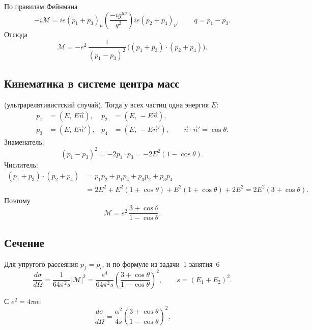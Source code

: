 \documentclass[../final.tex]{subfiles}
\begin{document}
По правилам Фейнмана
\begin{equation*}
    -i\mathcal M=ie(p_1+p_3)_\mu
    \left(\frac{-ig^{\mu\nu}}{q^2}\right)
    ie(p_2+p_4)_\nu,
    \qquad
    q=p_1-p_3.
\end{equation*}
Отсюда
\begin{equation*}
    \mathcal M=-e^2\,\frac{1}{(p_1-p_3)^2}\,
    \bigl((p_1+p_3)\cdot(p_2+p_4)\bigr).
\end{equation*}

\subsection*{Кинематика в системе центра масс}

(ультрарелятивистский случай). Тогда у всех частиц одна энергия $E$:
\begin{align*}
    p_1&=(E,\,E\vec n), & p_2&=(E,\,-E\vec n),\\
    p_3&=(E,\,E\vec n'), & p_4&=(E,\,-E\vec n'),
    \qquad \vec n\cdot\vec n'=\cos\theta.
\end{align*}
Знаменатель:
\begin{equation*}
    (p_1-p_3)^2=-2p_1\cdot p_3=-2E^2(1-\cos\theta).
\end{equation*}
Числитель:
\begin{align*}
    (p_1+p_3)\cdot(p_2+p_4)
    &=p_1p_2+p_1p_4+p_3p_2+p_3p_4\\
    &=2E^2+E^2(1+\cos\theta)+E^2(1+\cos\theta)+2E^2
    =2E^2(3+\cos\theta).
\end{align*}
Поэтому
\begin{equation*}
    \mathcal M=e^2\,\frac{3+\cos\theta}{1-\cos\theta}.
\end{equation*}

\subsection*{Сечение}

Для упругого рассеяния $p_f=p_i$, и по формуле
из задачи~1 занятия~6
\begin{equation*}
    \frac{d\sigma}{d\Omega}=\frac{1}{64\pi^2s}|\mathcal M|^2
    =\frac{e^4}{64\pi^2s}
    \left(\frac{3+\cos\theta}{1-\cos\theta}\right)^2,
    \qquad
    s=(E_1+E_2)^2.
\end{equation*}

\answer
С $e^2=4\pi\alpha$:
\begin{equation*}
    \frac{d\sigma}{d\Omega}=\frac{\alpha^2}{4s}
    \left(\frac{3+\cos\theta}{1-\cos\theta}\right)^2.
\end{equation*}
\end{document}
